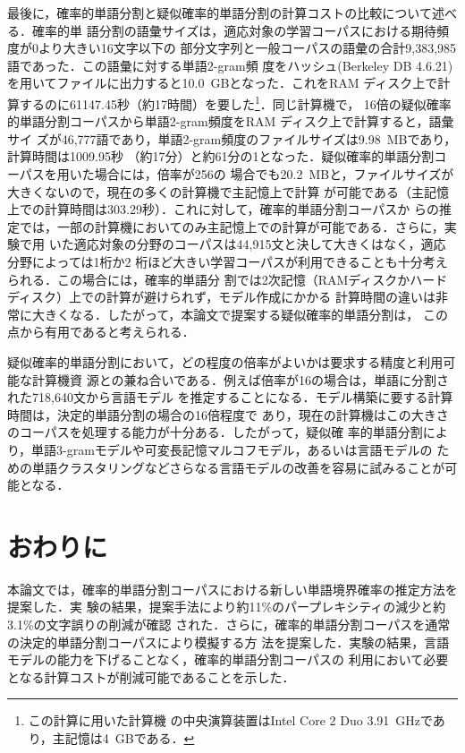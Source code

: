 \documentclass[japanese]{jnlp_1.4}
\begin{document}
最後に，確率的単語分割と疑似確率的単語分割の計算コストの比較について述べる．確率的単
語分割の語彙サイズは，適応対象の学習コーパスにおける期待頻度が0より大きい16文字以下の
部分文字列と一般コーパスの語彙の合計9,383,985語であった．この語彙に対する単語2-gram頻
度をハッシュ(Berkeley DB 4.6.21)を用いてファイルに出力すると10.0~GBとなった．これをRAM
ディスク上で計算するのに61147.45秒（約17時間）を要した\footnote{この計算に用いた計算機
の中央演算装置はIntel Core 2 Duo 3.91~GHzであり，主記憶は4~GBである．}．同じ計算機で，
16倍の疑似確率的単語分割コーパスから単語2-gram頻度をRAM ディスク上で計算すると，語彙サイ
ズが46,777語であり，単語2-gram頻度のファイルサイズは9.98~MBであり，計算時間は1009.95秒
（約17分）と約61分の1となった．疑似確率的単語分割コーパスを用いた場合には，倍率が256の
場合でも20.2~MBと，ファイルサイズが大きくないので，現在の多くの計算機で主記憶上で計算
が可能である（主記憶上での計算時間は303.29秒）．これに対して，確率的単語分割コーパスか
らの推定では，一部の計算機においてのみ主記憶上での計算が可能である．さらに，実験で用
いた適応対象の分野のコーパスは44,915文と決して大きくはなく，適応分野によっては1桁か2
桁ほど大きい学習コーパスが利用できることも十分考えられる．この場合には，確率的単語分
割では2次記憶（RAMディスクかハードディスク）上での計算が避けられず，モデル作成にかかる
計算時間の違いは非常に大きくなる．したがって，本論文で提案する疑似確率的単語分割は，
この点から有用であると考えられる．

疑似確率的単語分割において，どの程度の倍率がよいかは要求する精度と利用可能な計算機資
源との兼ね合いである．例えば倍率が16の場合は，単語に分割された718,640文から言語モデル
を推定することになる．モデル構築に要する計算時間は，決定的単語分割の場合の16倍程度で
あり，現在の計算機はこの大きさのコーパスを処理する能力が十分ある．したがって，疑似確
率的単語分割により，単語3-gramモデルや可変長記憶マルコフモデル，あるいは言語モデルの
ための単語クラスタリングなどさらなる言語モデルの改善を容易に試みることが可能となる．



\section{おわりに}

本論文では，確率的単語分割コーパスにおける新しい単語境界確率の推定方法を提案した．実
験の結果，提案手法により約11\%のパープレキシティの減少と約3.1\%の文字誤りの削減が確認
された．さらに，確率的単語分割コーパスを通常の決定的単語分割コーパスにより模擬する方
法を提案した．実験の結果，言語モデルの能力を下げることなく，確率的単語分割コーパスの
利用において必要となる計算コストが削減可能であることを示した．
\end{document}
